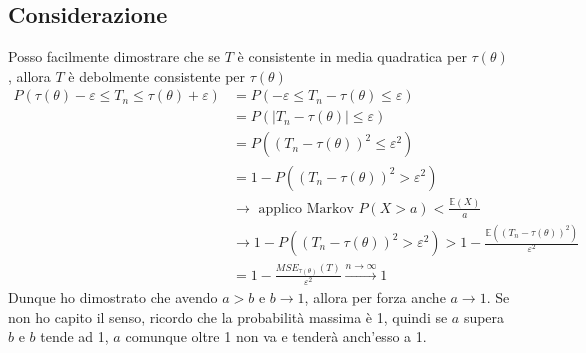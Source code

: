 \documentclass[11pt]{report}
\begin{document}
\subsection{Considerazione}
Posso facilmente dimostrare che se $T$ è consistente in media quadratica per $\tau(\theta)$, allora $T$ è debolmente consistente per $\tau(\theta)$
\begin{equation}
    \begin{split}
        P(\tau(\theta) - \varepsilon \leq T_n \leq \tau(\theta) + \varepsilon) & = P(-\varepsilon \leq T_n - \tau(\theta) \leq \varepsilon)\\
        & = P \left( \mid T_n - \tau(\theta) \mid \leq \varepsilon \right)\\
        & = P \left( (T_n - \tau(\theta))^2 \leq \varepsilon^2 \right)\\
        & = 1 - P \left( (T_n - \tau(\theta))^2 > \varepsilon^2 \right)\\
        & \rightarrow \text{ applico Markov } P(X > a) < \frac{\mathbb{E}(X)}{a}\\
        & \rightarrow 1 - P \left( (T_n - \tau(\theta))^2 > \varepsilon^2 \right) > 1 - \frac{\mathbb{E} \left( (T_n - \tau(\theta))^2 \right)}{\varepsilon^2}\\
        & = 1 - \frac{MSE_{\tau(\theta)}(T)}{\varepsilon^2} \overset{n\rightarrow\infty}{\rightarrow} 1
    \end{split}
\end{equation}
Dunque ho dimostrato che avendo $a > b$ e $b \rightarrow 1$, allora per forza anche $a \rightarrow 1$. Se non ho capito il senso, ricordo che la probabilità massima è 1, quindi se $a$ supera $b$ e $b$ tende ad 1, $a$ comunque oltre 1 non va e tenderà anch'esso a 1.
\end{document}
